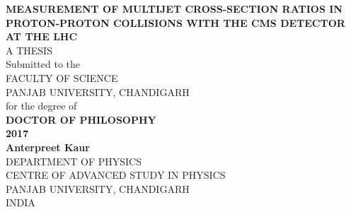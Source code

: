 {
\pagestyle{empty}
\begin{center}
\renewcommand{\rmdefault}{phv} %
{\fontsize{14}{16}\sf \bf MEASUREMENT OF MULTIJET CROSS-SECTION RATIOS IN PROTON-PROTON COLLISIONS WITH THE CMS DETECTOR AT THE LHC}
\\ [3.8cm]

{\fontsize{12}{14} \sf A THESIS} \\
\vspace{0.3cm}
{ \sf Submitted to the \\
{\fontsize{12}{14} FACULTY OF SCIENCE \\
PANJAB UNIVERSITY, CHANDIGARH \\ }
for the degree of }\\
\vspace{0.5cm}
{\fontsize{14}{16}  \bf DOCTOR OF PHILOSOPHY}\\ [2.0cm]
{\fontsize{14}{16} \sf \textbf{2017}} \\[2.0cm]
{\fontsize{14}{16} \bf Anterpreet Kaur}\\[1.25cm]
{\fontsize{12}{14} \sf DEPARTMENT OF PHYSICS \\
CENTRE OF ADVANCED STUDY IN PHYSICS\\
PANJAB UNIVERSITY, CHANDIGARH\\
INDIA}
\end{center}

}
